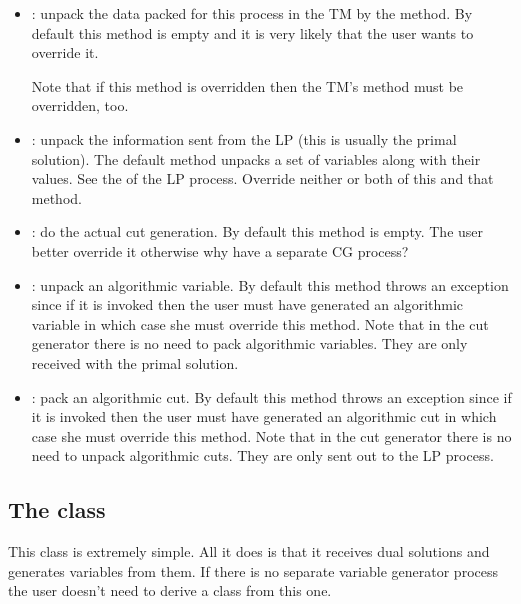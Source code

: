 \begin{itemize}
\item {}: unpack the data packed for this process in
  the TM by the  method. By default
  this method is empty and it is very likely that the user wants to override
  it.

  Note that if this method is overridden then the TM's
   method must be overridden, too.

\item {}: unpack the information sent from 
  the LP (this is usually the primal solution). The default method unpacks a
  set of variables along with their values. See the 
   of the LP process.
  Override neither or both of this and that method.

\item {}: do the actual cut generation. By default this
  method is empty. The user better override it otherwise why have a separate
  CG process?

\item {}: unpack an algorithmic variable. By
  default this method throws an exception since if it is invoked then the user
  must have generated an algorithmic variable in which case she must override
  this method. Note that in the cut generator there is no need to pack
  algorithmic variables. They are only received with the primal solution.

\item {}: pack an algorithmic cut. By
  default this method throws an exception since if it is invoked then the user
  must have generated an algorithmic cut in which case she must override
  this method. Note that in the cut generator there is no need to unpack
  algorithmic cuts. They are only sent out to the LP process.


\end{itemize}

\subsection{The  class}
This class is extremely simple. All it does is that it receives dual
solutions and generates variables from them. If there is no separate variable
generator process the user doesn't need to derive a class from this one.

